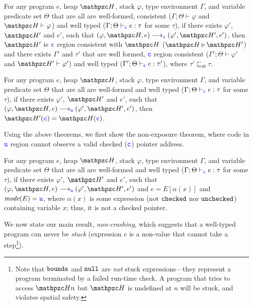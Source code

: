 \begin{thm}
For any \lang program $e$, heap $\heap$, stack
$\varphi$, type environment $\Gamma$, and variable predicate set $\Theta$
that are all are well-formed, consistent
($\Gamma;\Theta\vdash \varphi$ and $\heap \vdash \varphi$) and well
typed ($\Gamma;\Theta\vdash_{\textcolor{blue}{\texttt{c}}} e : \tau$ for some $\tau$), if there exists $\varphi'$,
$\heap'$ and $e'$, such that $(\varphi,\heap,e)
\longrightarrow_{\cmode} (\varphi',\heap',e')$, then $\heap'$ is
$\textcolor{blue}{\texttt{c}}$ region consistent with $\heap$ ($\heap \triangleright \heap'$) and there exists
$\Gamma'$ and $\tau'$ that are well formed, $\textcolor{blue}{\texttt{c}}$ region consistent
($\Gamma';\Theta\vdash \varphi'$ and $\heap' \vdash \varphi'$) and
well typed ($\Gamma';\Theta \vdash_{\textcolor{blue}{\texttt{c}}} e: \tau'$), where
$\tau'\sqsubseteq_{\Theta} \tau$.
\end{thm}
\begin{thm}
For any \lang program $e$, heap $\heap$, stack
$\varphi$, type environment $\Gamma$, and variable predicate set $\Theta$
that are all are well-formed and well
typed ($\Gamma;\Theta\vdash_{\textcolor{blue}{\texttt{c}}} e : \tau$ for some $\tau$), if there exists $\varphi'$,
$\heap'$ and $e'$, such that $(\varphi,\heap,e)
\longrightarrow_{\umode} (\varphi',\heap',e')$, then $\heap'(\cmode)=\heap(\cmode)$.
\end{thm}

Using the above theorems, we first show the non-exposure theorem,
where code in $\textcolor{blue}{\texttt{u}}$ region cannot observe a valid checked ($\textcolor{blue}{\texttt{c}}$) pointer address.

\begin{thm}
For any \lang program $e$, heap $\heap$, stack
$\varphi$, type environment $\Gamma$, and variable predicate set $\Theta$
that are all are well-formed and well
typed ($\Gamma;\Theta\vdash_{\textcolor{blue}{\texttt{c}}} e : \tau$ for some $\tau$), if there exists $\varphi'$,
$\heap'$ and $e'$, such that $(\varphi,\heap,e)
\longrightarrow_{\umode} (\varphi',\heap',e')$ and $e=E[\alpha(x)]$ and $\textit{mode}(E)=\textcolor{blue}{\texttt{u}}$,
where $\alpha(x)$ is some expression (not $\mathtt{checked}$ nor $\mathtt{unchecked}$) containing variable $x$; 
thus, it is not a checked pointer.
\end{thm}

We now state our main result, {\em non-crashing},
which suggests that a well-typed program can never be \emph{stuck} (expression
$e$ is a non-value that cannot take a step\footnote{Note that
  $\mathtt{bounds}$ and $\mathtt{null}$ are \emph{not} stuck expressions---they represent a
  program terminated by a failed run-time check. A program that tries to access $\heap{n}$
  but $\heap$ is undefined at $n$ will be stuck, and violates spatial
  safety.}).

